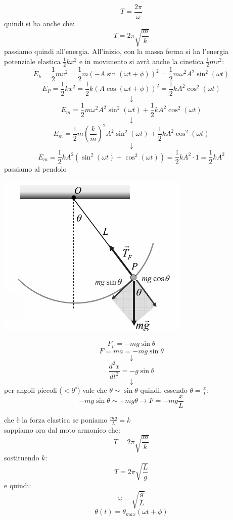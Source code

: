 \documentclass[a4paper,12pt, oneside]{book}
\begin{document}
$$T=\frac{2\pi}{\omega}$$
quindi si ha anche che:
$$T=2\pi\sqrt{\frac{m}{k}}$$
passiamo quindi all'energia. All'inizio, con la massa ferma si ha l'energia potenziale elastica $\frac{1}{2}kx^2$ e in movimento si avrà anche la cinetica $\frac{1}{2}mv^2$:
$$E_k=\frac{1}{2}mv^2=\frac{1}{2}m(-A\sin(\omega t+\phi))^2=\frac{1}{2}m\omega^2A^2\sin^2(\omega t)$$
$$E_P=\frac{1}{2}kx^2=\frac{1}{2}k(A\cos(\omega t+\phi))^2=\frac{1}{2}kA^2\cos^2(\omega t)$$
$$\downarrow$$
$$E_m=\frac{1}{2}m\omega^2A^2\sin^2(\omega t)+\frac{1}{2}kA^2\cos^2(\omega t)$$
$$\downarrow$$
$$E_m=\frac{1}{2}m\left(\frac{k}{m}\right)^2A^2\sin^2(\omega t)+\frac{1}{2}kA^2\cos^2(\omega t)$$
$$\downarrow$$
$$E_m=\frac{1}{2}kA^2(\sin^2(\omega t)+\cos^2(\omega t))=\frac{1}{2}kA^2\cdot 1=\frac{1}{2}kA^2$$
passiamo al pendolo
\begin{center}
\includegraphics[scale=0.6]{img/pen.png}
\end{center}
$$F_p=-mg\sin\theta$$
$$F=ma=-mg\sin\theta $$
$$\downarrow$$
$$\frac{d^2x}{dt^2}=-g\sin\theta$$
$$\downarrow$$
per angoli piccoli ($<9^\circ$) vale che $\theta\sim \sin\theta$ quindi, essendo $\theta=\frac{x}{L}$:
$$-mg\sin\theta\sim -mg \theta\longrightarrow F=-mg\frac{x}{L}$$

che è la forza elastica se poniamo $\frac{mg}{L}=k$
\\ sappiamo ora dal moto armonico che:
$$T=2\pi\sqrt{\frac{m}{k}}$$
sostituendo $k$:
$$T=2\pi\sqrt{\frac{L}{g}}$$
e quindi:
$$\omega=\sqrt{\frac{g}{L}}$$
$$\theta(t)=\theta_{max}(\omega t+\phi)$$
\end{document}
